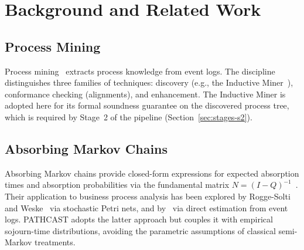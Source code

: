 
\section{Background and Related Work}
\label{sec:background}

\subsection{Process Mining}
\label{sec:bg-pm}

Process mining~\cite{aalst2016process} extracts process knowledge from
event logs. The discipline distinguishes three families of techniques:
discovery (e.g., the Inductive Miner~\cite{leemans2013discovering}),
conformance checking (alignments), and enhancement.
The Inductive Miner is adopted here for its
formal soundness guarantee on the discovered process tree, which is
required by Stage~2 of the pipeline (Section~\ref{sec:stages-s2}).


\subsection{Absorbing Markov Chains}
\label{sec:bg-markov}

Absorbing Markov chains provide closed-form expressions for expected
absorption times and absorption probabilities via the fundamental matrix
$N = (I-Q)^{-1}$~\cite{kemeny1976finite}. Their application to business
process analysis has been explored by Rogge-Solti and
Weske~\cite{RoggeSolti2015NonMarkovianSPN} via stochastic Petri nets,
and by~\cite{Spedicato2017} via direct estimation from event logs.
PATHCAST adopts the latter approach but couples it with empirical
sojourn-time distributions, avoiding the parametric assumptions of
classical semi-Markov treatments.

